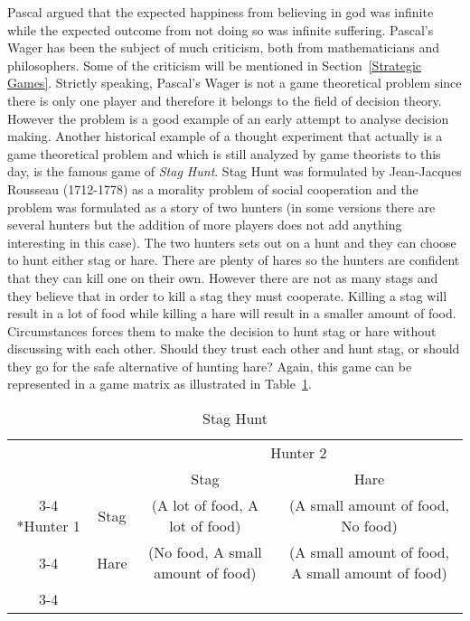 \documentclass{article}
\theoremstyle{definition}
\theoremstyle{remark}
\begin{document}
Pascal argued that the expected happiness from believing in god was
infinite while the expected outcome from not doing so was infinite
suffering. Pascal's Wager has been the subject of much criticism, both
from mathematicians and philosophers. Some of the criticism
  will be mentioned in Section~\ref{Strategic Games}. Strictly speaking, Pascal's Wager is not a
game theoretical problem since there is only one player and therefore it
belongs to the field of decision theory. However the problem is a good
example of an early attempt to analyse decision making. Another
historical example of a thought experiment that actually is a game
theoretical problem and which is still analyzed by game theorists to
this day, is the famous game of \emph{Stag Hunt}. Stag Hunt was
formulated by Jean-Jacques Rousseau (1712-1778) as a morality problem
of social cooperation and the problem was formulated as a story of two
hunters (in some versions there are several hunters but the addition
of more players does not add anything interesting in this case). \citep{sep-game-ethics} The
two hunters sets out on a hunt and they can choose to hunt either stag
or hare. There are plenty of hares so the hunters are confident that
they can kill one on their own. However there are not as many stags
and they believe that in order to kill a stag they must
cooperate. Killing a stag will result in a lot of food while killing
a hare will result in a smaller amount of food. Circumstances forces
them to make the decision to hunt stag or hare without discussing with
each other. Should they trust each other and hunt stag, or should they
go for the safe alternative of hunting hare? Again, this game can be
represented in a game matrix as illustrated in Table~\ref{Stag hunt 1}.\\ 

\begin{table}[h!]
  \centering
  \setlength{\extrarowheight}{2pt}
  \begin{tabular}{cc|c|c|}
    & \multicolumn{1}{c}{} & \multicolumn{2}{c}{Hunter 2}\\
    & \multicolumn{1}{c}{} & \multicolumn{1}{c}{Stag}  &
                                                              \multicolumn{1}{c}{Hare}
    \\\cline{3-4}
\multirow{2}*{Hunter 1}  & Stag & (A lot of food, A lot of food) &
                                                                   (A small amount
                                        of food,
                                                                   No food) \\\cline{3-4}
    & Hare & (No food, A small amount
                                        of food) & (A small amount
                                        of food, A small amount
                                        of food) \\\cline{3-4}
  \end{tabular}
  \caption{Stag Hunt}
  \label{Stag hunt 1}
\end{table}
\end{document}
